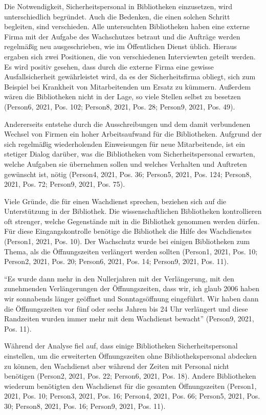 \documentclass[a4paper,
fontsize=11pt,
oneside,
numbers=noperiodatend,
parskip=half-,
bibliography=totoc,
final
]{scrartcl}
\begin{document}
Die Notwendigkeit, Sicherheitspersonal in Bibliotheken einzusetzen, wird
unterschiedlich begründet. Auch die Bedenken, die einen solchen Schritt
begleiten, sind verschieden. Alle untersuchten Bibliotheken haben eine
externe Firma mit der Aufgabe des Wachschutzes betraut und die Aufträge
werden regelmäßig neu ausgeschrieben, wie im Öffentlichen Dienst üblich.
Hieraus ergaben sich zwei Positionen, die von verschiedenen Interviewten
geteilt werden. Es wird positiv gesehen, dass durch die externe Firma
eine gewisse Ausfallsicherheit gewährleistet wird, da es der
Sicherheitsfirma obliegt, sich zum Beispiel bei Krankheit von
Mitarbeitenden um Ersatz zu kümmern. Außerdem wären die Bibliotheken
nicht in der Lage, so viele Stellen selbst zu besetzen (Person6, 2021,
Pos. 102; Person8, 2021, Pos. 28; Person9, 2021, Pos. 49).

Andererseits entstehe durch die Ausschreibungen und dem damit
verbundenen Wechsel von Firmen ein hoher Arbeitsaufwand für die
Bibliotheken. Aufgrund der sich regelmäßig wiederholenden Einweisungen
für neue Mitarbeitende, ist ein stetiger Dialog darüber, was die
Bibliotheken vom Sicherheitspersonal erwarten, welche Aufgaben sie
übernehmen sollen und welches Verhalten und Auftreten gewünscht ist,
nötig (Person4, 2021, Pos. 36; Person5, 2021, Pos. 124; Person8, 2021,
Pos. 72; Person9, 2021, Pos. 75).

Viele Gründe, die für einen Wachdienst sprechen, beziehen sich auf die
Unterstützung in der Bibliothek. Die wissenschaftlichen Bibliotheken
kontrollieren oft strenger, welche Gegenstände mit in die Bibliothek
genommen werden dürfen. Für diese Eingangskontrolle benötige die
Bibliothek die Hilfe des Wachdienstes (Person1, 2021, Pos. 10). Der
Wachschutz wurde bei einigen Bibliotheken zum Thema, als die
Öffnungszeiten verlängert werden sollten (Person1, 2021, Pos. 10;
Person2, 2021, Pos. 20; Person6, 2021, Pos. 14; Person9, 2021, Pos. 11).

\begin{flushright}
\enquote{Es wurde dann mehr in den Nullerjahren mit der Verlängerung,
mit den zunehmenden Verlängerungen der Öffnungszeiten, dass wir, ich
glaub 2006 haben wir sonnabends länger geöffnet und Sonntagsöffnung
eingeführt. Wir haben dann die Öffnungszeiten vor fünf oder sechs Jahren
bis 24 Uhr verlängert und diese Randzeiten wurden immer mehr mit dem
Wachdienst bewacht} \linebreak(Person9, 2021, Pos. 11).
\end{flushright}

Während der Analyse fiel auf, dass einige Bibliotheken
Sicherheitspersonal einstellen, um die erweiterten Öffnungszeiten ohne
Bibliothekspersonal abdecken zu können, den Wachdienst aber während der
Zeiten mit Personal nicht benötigen (Person2, 2021, Pos. 22; Person6,
2021, Pos. 18). Andere Bibliotheken wiederum benötigten den Wachdienst
für die gesamten Öffnungszeiten (Person1, 2021, Pos. 10; Person3, 2021,
Pos. 16; Person4, 2021, Pos. 66; Person5, 2021, Pos. 30; Person8, 2021,
Pos. 16; Person9, 2021, Pos. 11).
\end{document}
